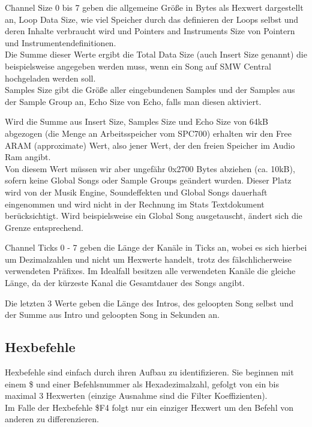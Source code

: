 Channel Size 0 bis 7 geben die allgemeine Größe in Bytes als Hexwert dargestellt an,
Loop Data Size, wie viel Speicher durch das definieren der Loops selbst und deren Inhalte verbraucht wird und Pointers and Instruments Size von Pointern und Instrumentendefinitionen. \\
Die Summe dieser Werte ergibt die Total Data Size (auch Insert Size genannt) die beispielsweise angegeben werden muss, wenn ein Song auf SMW Central hochgeladen werden soll. \\
Samples Size gibt die Größe aller eingebundenen Samples und der Samples aus der Sample Group an, Echo Size von Echo, falls man diesen aktiviert.

\bigskip

Wird die Summe aus Insert Size, Samples Size und Echo Size von 64kB abgezogen (die Menge an Arbeitsspeicher vom SPC700) erhalten wir den Free ARAM (approximate) Wert, also jener Wert, der den freien Speicher im Audio Ram angibt. \\
Von diesem Wert müssen wir aber ungefähr 0x2700 Bytes abziehen (ca. 10kB), sofern keine Global Songs oder Sample Groups geändert wurden. Dieser Platz wird von der Musik Engine, Soundeffekten und Global Songs dauerhaft eingenommen und wird nicht in der Rechnung im Stats Textdokument berücksichtigt. Wird beispielsweise ein Global Song ausgetauscht, ändert sich die Grenze entsprechend.

\bigskip

Channel Ticks 0 - 7 geben die Länge der Kanäle in Ticks an, wobei es sich hierbei um Dezimalzahlen und nicht um Hexwerte handelt, trotz des fälschlicherweise verwendeten Präfixes. Im Idealfall besitzen alle verwendeten Kanäle die gleiche Länge, da der kürzeste Kanal die Gesamtdauer des Songs angibt.

\bigskip

Die letzten 3 Werte geben die Länge des Intros, des geloopten Song selbst und der Summe aus Intro und geloopten Song in Sekunden an.

\subsection{Hexbefehle}

Hexbefehle sind einfach durch ihren Aufbau zu identifizieren. Sie beginnen mit einem \$ und einer Befehlsnummer als Hexadezimalzahl, gefolgt von ein bis maximal 3 Hexwerten (einzige Ausnahme sind die Filter Koeffizienten). \\
Im Falle der Hexbefehle \$F4 folgt nur ein einziger Hexwert um den Befehl von anderen zu differenzieren.

